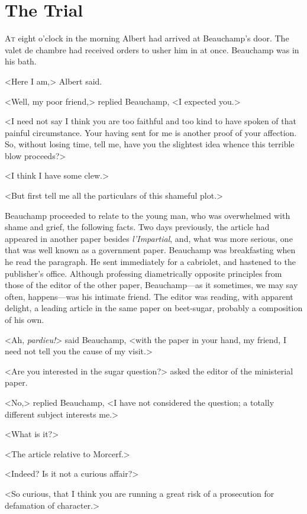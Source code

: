 \chapter{The Trial} 

 \lettrine{A}{t} eight o'clock in the morning Albert had arrived at Beauchamp's door. The valet de chambre had received orders to usher him in at once. Beauchamp was in his bath. 

 <Here I am,> Albert said. 

 <Well, my poor friend,> replied Beauchamp, <I expected you.> 

 <I need not say I think you are too faithful and too kind to have spoken of that painful circumstance. Your having sent for me is another proof of your affection. So, without losing time, tell me, have you the slightest idea whence this terrible blow proceeds?> 

 <I think I have some clew.> 

 <But first tell me all the particulars of this shameful plot.> 

 Beauchamp proceeded to relate to the young man, who was overwhelmed with shame and grief, the following facts. Two days previously, the article had appeared in another paper besides \textit{ l'Impartial}, and, what was more serious, one that was well known as a government paper. Beauchamp was breakfasting when he read the paragraph. He sent immediately for a cabriolet, and hastened to the publisher's office. Although professing diametrically opposite principles from those of the editor of the other paper, Beauchamp—as it sometimes, we may say often, happens—was his intimate friend. The editor was reading, with apparent delight, a leading article in the same paper on beet-sugar, probably a composition of his own. 

 <Ah, \textit{pardieu!}> said Beauchamp, <with the paper in your hand, my friend, I need not tell you the cause of my visit.> 

 <Are you interested in the sugar question?> asked the editor of the ministerial paper. 

 <No,> replied Beauchamp, <I have not considered the question; a totally different subject interests me.> 

 <What is it?> 

 <The article relative to Morcerf.> 

 <Indeed? Is it not a curious affair?> 

 <So curious, that I think you are running a great risk of a prosecution for defamation of character.> 

